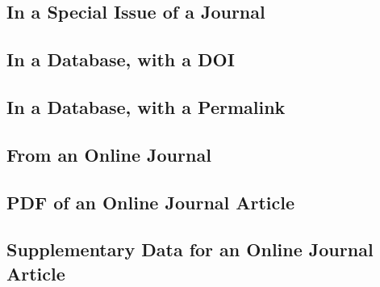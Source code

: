 \documentclass{article}
\begin{document}
\subsection{In a Special Issue of a Journal} %
\label{sub:in_a_special_issue_of_a_journal}
\begin{refsection}
	\nocite{Charney:2011wk}
	\printbibliography[heading=none]
\end{refsection}
\subsection{In a Database, with a DOI} %
\label{sub:in_a_database_with_a_doi}
\begin{refsection}
	\nocite{Bockelman:uu}
	\printbibliography[heading=none]
\end{refsection}
\subsection{In a Database, with a Permalink} %
\label{sub:in_a_database_with_a_permalink}
\begin{refsection}
	\nocite{Goldman:2010wd}
	\printbibliography[heading=none]
\end{refsection}
\subsection{From an Online Journal} %
\label{sub:from_an_online_journal}
\begin{refsection}
	\nocite{Alpert-Abrams:2016wb}
	\printbibliography[heading=none]
\end{refsection}
\subsection{PDF of an Online Journal Article} %
\label{sub:pdf_of_an_online_journal_article}
\begin{refsection}
	\nocite{Fisher:vu}
	\printbibliography[heading=none]
\end{refsection}
\subsection{Supplementary Data for an Online Journal Article} %
\label{sub:supplementary_data_for_an_online_journal_article}
\begin{refsection}
	\nocite{Moskowitz:uw}
	\printbibliography[heading=none]
\end{refsection}
\end{document}
